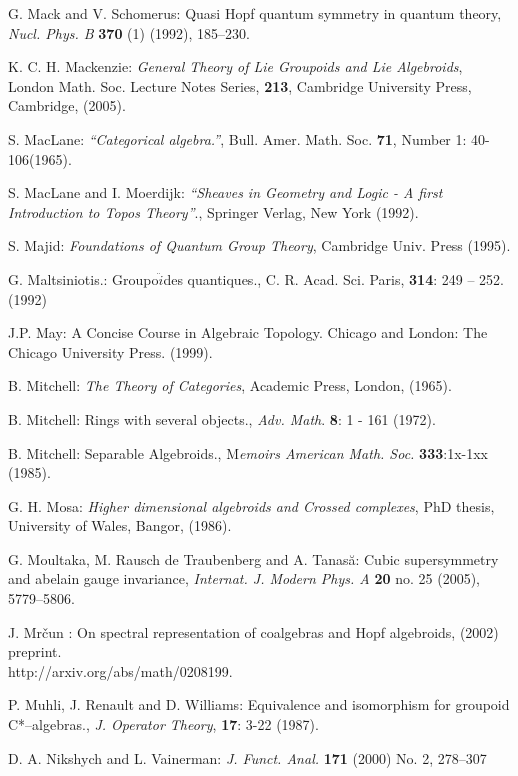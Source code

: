 \documentclass[12pt]{article}
\theoremstyle{plain}
\theoremstyle{definition}
\numberwithin{equation}{section}
\newcommand{\<}{{\langle}}
\begin{document}
\begin{thebibliography}{99}
G. Mack and V. Schomerus: Quasi Hopf quantum symmetry in quantum
theory, \emph{Nucl. Phys. B} \textbf{370} (1) (1992), 185--230.

K. C. H. Mackenzie: \emph{General Theory of Lie Groupoids and Lie
Algebroids}, London Math. Soc. Lecture Notes Series, \textbf{213},
Cambridge University Press, Cambridge, (2005).

S. MacLane: \textit{``Categorical algebra.''},  Bull. Amer. Math. Soc. \textbf{71}, Number 1: 40-106(1965).

S. MacLane and I. Moerdijk: \textit{``Sheaves in Geometry and Logic - A
first Introduction to Topos Theory''}., Springer Verlag, New York
(1992).

S. Majid: \emph{Foundations of Quantum Group Theory}, Cambridge
Univ. Press (1995).

G. Maltsiniotis.: Groupo$\ddot{i}$des quantiques., C. R. Acad. Sci. Paris, \textbf{314}:
249 -- 252.(1992)

J.P. May: A Concise Course in Algebraic Topology. Chicago and London: The Chicago University
Press. (1999).

B. Mitchell: \emph{The Theory of Categories}, Academic Press,
London, (1965).

B. Mitchell: Rings with several objects., \textit{Adv. Math}. \textbf{8}: 1 - 161 (1972).

B. Mitchell: Separable Algebroids., M\textit{emoirs American Math. Soc.} \textbf{333}:1x-1xx (1985).

G. H. Mosa: \emph{Higher dimensional algebroids and Crossed
complexes}, PhD thesis, University of Wales, Bangor, (1986).

G. Moultaka, M. Rausch de Traubenberg and A. Tanas\u a: Cubic
supersymmetry and abelain gauge invariance, \emph{Internat. J.
Modern Phys. A} \textbf{20} no. 25 (2005), 5779--5806.

J. Mr\v cun : On spectral representation of coalgebras and Hopf
algebroids, (2002) preprint.\\ http://arxiv.org/abs/math/0208199.

P. Muhli, J. Renault and D. Williams: Equivalence and isomorphism for groupoid C*--algebras., \textit{J. Operator Theory}, \textbf{17}: 3-22 (1987).

D. A. Nikshych and L. Vainerman: \emph{J. Funct. Anal.}
\textbf{171} (2000) No. 2, 278--307


\end{thebibliography}
\end{document}
